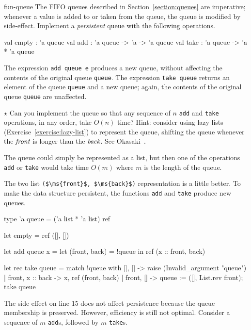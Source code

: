 %
\begin{exercise}{fun-queue}
The FIFO queues described in Section~\ref{section:queues} are imperative; whenever a value is added to
or taken from the queue, the queue is modified by side-effect.  Implement a \emph{persistent} queue
with the following operations.

\begin{ocaml}
val empty : 'a queue
val add   : 'a queue -> 'a -> 'a queue
val take  : 'a queue -> 'a * 'a queue
\end{ocaml}
%
The expression \hbox{\lstinline/add queue e/} produces a new queue, without affecting the contents of the
original queue \hbox{\lstinline/queue/}.  The expression \hbox{\lstinline/take queue/} returns an element of the
queue \hbox{\lstinline/queue/} and a new queue; again, the contents of the original queue \hbox{\lstinline/queue/}
are unaffected.

$\star$ Can you implement the queue so that any sequence of $n$ \hbox{\lstinline/add/} and \hbox{\lstinline/take/}
operations, in any order, take $O(n)$ time?  Hint: consider using lazy lists
(Exercise~\ref{exercise:lazy-list}) to represent the queue, shifting the queue whenever the
$\textit{front}$ is longer than the $\textit{back}$.  See Okasaki~\cite{Oka95}.

\begin{answer}\ifanswers
The queue could simply be represented as a list, but then one of the operations \hbox{\lstinline/add/} or
\hbox{\lstinline/take/} would take time $O(m)$ where $m$ is the length of the queue.

The two list \hbox{\lstinline/($\ms{front}$, $\ms{back}$)/} representation is a little better.  To make the
data structure persistent, the functions \hbox{\lstinline/add/} and \hbox{\lstinline/take/} produce new queues.

\begin{ocamlnum}
type 'a queue = ('a list * 'a list) ref

let empty = ref ([], [])

let add queue x =
   let (front, back) = !queue in
   ref (x :: front, back)

let rec take queue =
   match !queue with
      [], [] -> raise (Invalid_argument "queue")
    | front, x :: back ->
        x, ref (front, back)
    | front, [] ->
        queue := ([], List.rev front);
        take queue
\end{ocamlnum}
%
The side effect on line 15 does not affect persistence because the queue membership is preserved.
However, efficiency is still not optimal.  Consider a sequence of $m$ \hbox{\lstinline/add/}s, followed by $m$ \hbox{\lstinline/take/}s.


\end{answer}
\end{exercise}
